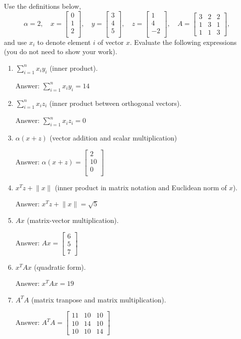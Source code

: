 \documentclass{article}
\newcommand{\blu}[1]{{\textcolor{blu}{#1}}}
\newcommand{\gre}[1]{\textcolor{gre}{#1}}
\newcommand\ans[1]{\par\gre{Answer: #1}}
\let\ask\blu
\newcommand{\norm}[1]{\lVert #1 \rVert}
\begin{document}
  Use the definitions below,
  \[
  \alpha = 2,\quad
  x = \left[\begin{array}{c}
  0\\
  1\\
  2\\
  \end{array}\right], \quad
  y = \left[\begin{array}{c}
  3\\
  4\\
  5\\
  \end{array}\right],\quad
  z = \left[\begin{array}{c}
  1\\
  4\\
  -2\\
  \end{array}\right],\quad
  A = \left[\begin{array}{ccc}
  3 & 2 & 2\\
  1 & 3 & 1\\
  1 & 1 & 3
  \end{array}\right],
  \]
  and use $x_i$ to denote element $i$ of vector $x$.
  \ask{Evaluate the following expressions} (you do not need to show your work).
  \begin{enumerate}
  \item $\sum_{i=1}^n x_iy_i$ (inner product).
   \ans{ $\sum_{i=1}^n x_iy_i=14$}
  \item $\sum_{i=1}^n x_i z_i$ (inner product between orthogonal vectors).
   \ans{$\sum_{i=1}^n x_i z_i = 0$}
  \item $\alpha(x+z)$ (vector addition and scalar multiplication)
   \ans{ $\alpha(x+z) = \left[\begin{array}{c}
       2  \\
       10 \\
       0\\
  \end{array}\right]$ }
  
  \item $x^Tz + \norm{x}$ (inner product in matrix notation and Euclidean norm of $x$).
   \ans{$x^Tz + \norm{x} = \sqrt{5}$  }
  \item $Ax$ (matrix-vector multiplication).
   \ans{ $Ax = \left[\begin{array}{c}
       6 \\
       5 \\
       7
  \end{array}\right]$}
  
  \item $x^TAx$ (quadratic form).
  \ans{$x^TAx = 19$} 
  \item $A^TA$ (matrix tranpose and matrix multiplication).
  \ans{
  $A^TA = \left[\begin{array}{ccc}
       11 & 10& 10  \\
       10& 14& 10 \\
       10 & 10 & 14
  \end{array}\right]$}
  \end{enumerate}
\end{document}
